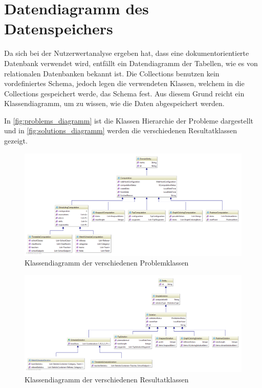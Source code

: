 \section{Datendiagramm des Datenspeichers}\label{datendiagramm_datenspeicher}
Da sich bei der Nutzerwertanalyse ergeben hat, dass eine dokumentorientierte Datenbank verwendet wird, entfällt ein Datendiagramm der Tabellen, wie es von relationalen Datenbanken 
bekannt ist. Die Collections benutzen kein vordefiniertes Schema, jedoch legen die verwendeten Klassen, welchem in die Collections gespeichert werde, das Schema fest. Aus diesem Grund 
reicht ein Klassendiagramm, um zu wissen, wie die Daten abgespeichert werden.

In \autoref{fig:problems_diagramm} ist die Klassen Hierarchie der Probleme dargestellt und in \autoref{fig:solutions_diagramm} werden die verschiedenen 
Resultatklassen gezeigt.

\begin{landscape}

\begin{figure}[h]
\centering
\includegraphics[scale=0.5]{images/computations_diagramm.png}
\caption[Klassendiagramm der verschiedenen Problemklassen]{Klassendiagramm der verschiedenen Problemklassen \selfmade{}}
\label{fig:problems_diagramm}
\end{figure}

\begin{figure}[h]
\centering
\includegraphics[scale=0.45]{images/solutions_diagramm.png}
\caption[Klassendiagramm der verschiedenen Resultatklassen]{Klassendiagramm der verschiedenen Resultatklassen \selfmade{}}
\label{fig:solutions_diagramm}
\end{figure}

\end{landscape}
